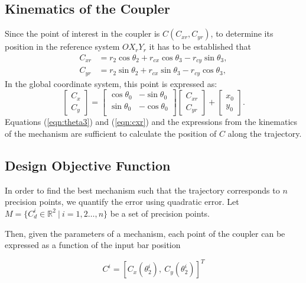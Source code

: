 \documentclass[12pt,letterpape]{article}
\begin{document}
\subsection{Kinematics of the Coupler} %
\label{sec:kinematics_of_the_coupler}
Since the point of interest in the coupler is $C(C_{xr}, C_{yr})$, to determine its position in the reference system $OX_r Y_r$ it has to be established that
\begin{align}
	C_{xr} &= r_2 \cos\theta_2 + r_{cx}\cos\theta_3 - r_{cy}\sin\theta_3,\\
	C_{yr} &= r_2 \sin\theta_2 + r_{cx}\sin\theta_3 - r_{cy}\cos\theta_3,
\end{align}
In the global coordinate system, this point is expressed as:
\begin{equation}
	\begin{bmatrix}
		C_x \\ C_y
	\end{bmatrix}
	=
	\begin{bmatrix}
		\cos\theta_0 & -\sin\theta_0\\
		\sin\theta_0 & -\cos\theta_0\\
	\end{bmatrix}
	\begin{bmatrix}
		C_{xr} \\ C_{yr}
	\end{bmatrix}
	+\begin{bmatrix}
		x_0 \\ y_0
	\end{bmatrix}.
	\label{eqn:cxr}
\end{equation}
Equations (\ref{eqn:theta3}) and (\ref{eqn:cxr}) and the expressions from the
kinematics of the mechanism are sufficient to calculate the position of
$C$ along the trajectory.

\subsection{Design Objective Function} %

In order to find the best mechanism such that the trajectory corresponds to $n$
precision points, we quantify the error using quadratic error. Let 
$M = \{ C^i_d \in \mathbb{R}^2 \ | \ i =1,2\ldots,n \}$ be a set of precision points.

Then, given the parameters of a mechanism, each point of the coupler can be
expressed as a function of the input bar position

$$
 C^i = [ C_x(\theta_2^i),\ C_y(\theta_2^i)]^T
$$
\end{document}
